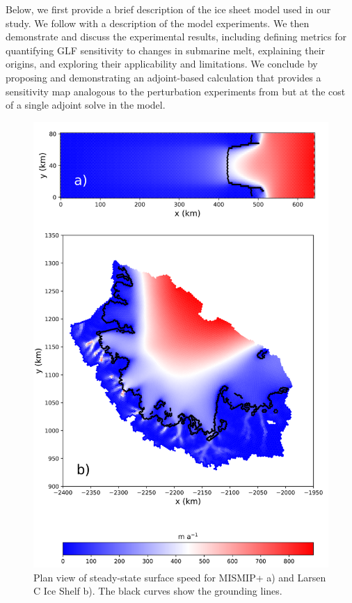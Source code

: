 \documentclass[tc, manuscript]{copernicus}
\begin{document}

Below, we first provide a brief description of the ice sheet model used in our study. We follow with a description of the model experiments. We then demonstrate and discuss the experimental results, including defining metrics for quantifying GLF sensitivity to changes in submarine melt, explaining their origins, and exploring their applicability and limitations.  We conclude by proposing and demonstrating an adjoint-based calculation that provides a sensitivity map analogous to the perturbation experiments from \citet{reese2018} but at the cost of a single adjoint solve in the model. 


\begin{figure}
\centering
\includegraphics[width=0.4\linewidth]{./figs/mismip_larsenc.pdf}
\caption{Plan view of steady-state surface speed for MISMIP+ a) and Larsen C Ice Shelf b). The black curves show the grounding lines.}
\label{mismip_larsenc}
\end{figure}
\end{document}
